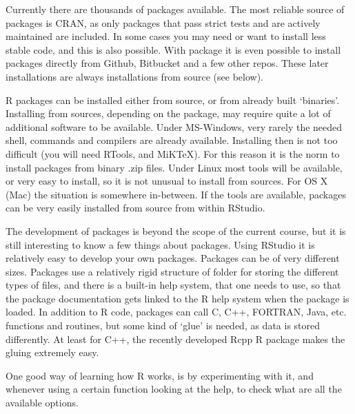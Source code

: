 \documentclass[paper=a4,10pt,div=17,headsepline,BCOR=12mm,twoside,open=right]{scrbook}\usepackage{knitr}
\begin{document}
\begin{knitrout}\footnotesize
{}\color{fgcolor}\begin{kframe}
\begin{alltt}
\end{alltt}
\end{kframe}
\end{knitrout}

Currently there are thousands of packages available. The most reliable source of packages is CRAN, as only packages that pass strict tests and are actively maintained are included. In some cases you may need or want to install less stable code, and this is also possible. With package  it is even possible to install packages directly from Github, Bitbucket and a few other repos. These later installations are always installations from source (see below).

R packages can be installed either from source, or from already built `binaries'. Installing from sources, depending on the package, may require quite a lot of additional software to be available. Under MS-Windows, very rarely the needed shell, commands and compilers are already available. Installing then is not too difficult (you will need RTools, and MiKTeX). For this reason it is the norm to install packages from binary .zip files. Under Linux most tools will be available, or very easy to install, so it is not unusual to install from sources. For OS X (Mac) the situation is somewhere in-between. If the tools are available, packages can be very easily installed from source from within RStudio.

The development of packages is beyond the scope of the current course, but it is still interesting to know a few things about packages. Using RStudio it is relatively easy to develop your own packages. Packages can be of very different sizes. Packages use a relatively rigid structure of folder for storing the different types of files, and there is a built-in help system, that one needs to use, so that the package documentation gets linked to the R help system when the package is loaded. In addition to R code, packages can call C, C++, FORTRAN, Java, etc. functions and routines, but some kind of `glue' is needed, as data is stored differently. At least for C++, the recently developed Rcpp R package makes the gluing extremely easy.

One good way of learning how R works, is by experimenting with it, and whenever using a certain function looking at the help, to check what are all the available options.
\end{document}
